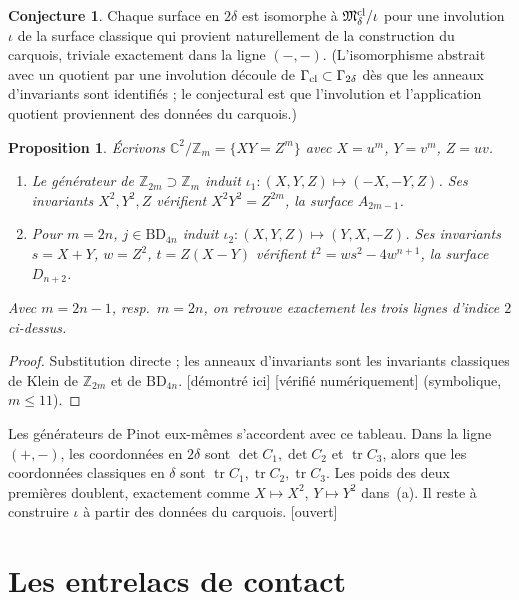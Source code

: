 \documentclass[11pt]{article}
\newtheorem{proposition}[theorem]{Proposition}
\theoremstyle{definition}
\newtheorem{conjecture}[theorem]{Conjecture}
\theoremstyle{remark}
\newcommand{\tagP}{\textsf{\small[démontré ici]}}
\newcommand{\tagN}{\textsf{\small[vérifié numériquement]}}
\newcommand{\tagO}{\textsf{\small\textcolor{red!70!black}{[ouvert]}}}
\newcommand{\C}{\mathbb{C}}\newcommand{\R}{\mathbb{R}}\newcommand{\Z}{\mathbb{Z}}
\newcommand{\M}{\mathfrak{M}}\newcommand{\Rep}{\mathrm{Rep}}\newcommand{\SRep}{\mathrm{SRep}}
\newcommand{\BD}{\mathrm{BD}}
\begin{document}
\begin{conjecture}\label{conj:C}
Chaque surface en $2\delta$ est isomorphe à $\M^{\rm cl}_\delta/\iota$ pour une involution $\iota$ de la surface classique qui provient naturellement de la construction du carquois, triviale exactement dans la ligne $(-,-)$. (L'isomorphisme abstrait avec un quotient par une involution découle de $\Gamma_{\rm cl}\subset\Gamma_{2\delta}$ dès que les anneaux d'invariants sont identifiés ; le conjectural est que l'involution et l'application quotient proviennent des données du carquois.)
\end{conjecture}

\begin{proposition}\label{prop:rings}
Écrivons $\C^2/\Z_m=\{XY=Z^m\}$ avec $X=u^m$, $Y=v^m$, $Z=uv$.
\begin{enumerate}[label=(\alph*)]
\item Le générateur de $\Z_{2m}\supset\Z_m$ induit $\iota_1:(X,Y,Z)\mapsto(-X,-Y,Z)$. Ses invariants $X^2,Y^2,Z$ vérifient $X^2Y^2=Z^{2m}$, la surface $A_{2m-1}$.
\item Pour $m=2n$, $j\in\BD_{4n}$ induit $\iota_2:(X,Y,Z)\mapsto(Y,X,-Z)$. Ses invariants $s=X+Y$, $w=Z^2$, $t=Z(X-Y)$ vérifient $t^2=ws^2-4w^{n+1}$, la surface $D_{n+2}$.
\end{enumerate}
Avec $m=2n-1$, resp.\ $m=2n$, on retrouve exactement les trois lignes d'indice $2$ ci-dessus.
\end{proposition}
\begin{proof}
Substitution directe ; les anneaux d'invariants sont les invariants classiques de Klein de $\Z_{2m}$ et de $\BD_{4n}$. \tagP{} \tagN{} (symbolique, $m\le11$).
\end{proof}

Les générateurs de Pinot eux-mêmes s'accordent avec ce tableau. Dans la ligne $(+,-)$, les coordonnées en $2\delta$ sont $\det C_1,\det C_2$ et $\operatorname{tr}C_3$, alors que les coordonnées classiques en $\delta$ sont $\operatorname{tr}C_1,\operatorname{tr}C_2,\operatorname{tr}C_3$. Les poids des deux premières doublent, exactement comme $X\mapsto X^2$, $Y\mapsto Y^2$ dans~(a). Il reste à construire $\iota$ à partir des données du carquois. \tagO

\section{Les entrelacs de contact}\label{sec:links}
\end{document}
